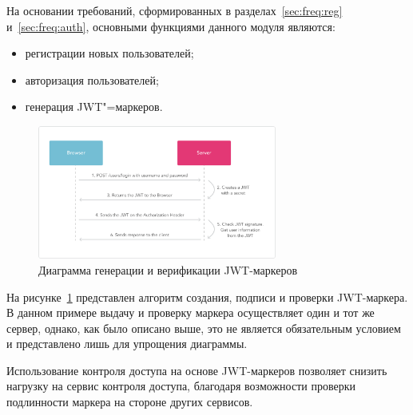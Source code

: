 На основании требований, сформированных в разделах~\ref{sec:freq:reg} и~\ref{sec:freq:auth}, основными функциями данного модуля являются:
\begin{itemize}
  \item регистрации новых пользователей;
  \item авторизация пользователей;
  \item генерация JWT"=маркеров.
\end{itemize}

\begin{figure}[ht]
    \centering
    \includegraphics[width=0.7\textwidth]{figures/jwt_diagram.png}
    \caption{Диаграмма генерации и верификации JWT-маркеров}
    \label{fig:architecture:jwt_diagram}
\end{figure}

На рисунке~\ref{fig:architecture:jwt_diagram} представлен алгоритм создания, подписи и проверки JWT-маркера. В данном примере выдачу и проверку маркера осуществляет один и тот же сервер, однако, как было описано выше, это не является обязательным условием и представлено лишь для упрощения диаграммы.

Использование контроля доступа на основе JWT-маркеров позволяет снизить нагрузку на сервис контроля доступа, благодаря возможности проверки подлинности маркера на стороне других сервисов.